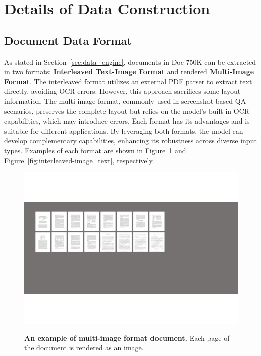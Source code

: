 \clearpage
\setcounter{page}{1}
\maketitlesupplementary

\section{Details of Data Construction}
\subsection{Document Data Format}
As stated in Section~\ref{sec:data_engine}, documents in Doc-750K can be extracted in two formats: \textbf{Interleaved Text-Image Format} and rendered \textbf{Multi-Image Format}. The interleaved format utilizes an external PDF parser to extract text directly, avoiding OCR errors. However, this approach sacrifices some layout information. The multi-image format, commonly used in screenshot-based QA scenarios, preserves the complete layout but relies on the model's built-in OCR capabilities, which may introduce errors. Each format has its advantages and is suitable for different applications. By leveraging both formats, the model can develop complementary capabilities, enhancing its robustness across diverse input types. Examples of each format are shown in Figure~\ref{fig:multi-image} and Figure~\ref{fig:interleaved-image_text}, respectively.


\begin{figure}[t]
    \centering
    {\includegraphics[width=\linewidth]{figure/multi-image_format.pdf}}
    \caption{
    \textbf{An example of multi-image format document.} Each page of the document is rendered as an image.
    }
    \label{fig:multi-image}
\end{figure}

